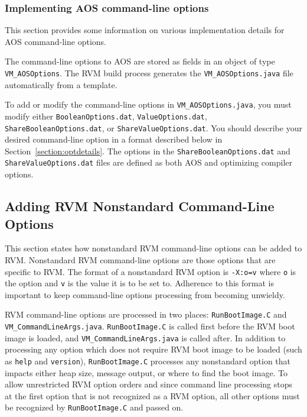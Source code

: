 \subsubsection{Implementing AOS command-line options}

This section provides some information on various
implementation details for AOS command-line options.

The command-line options to AOS are
stored as fields in an object of type {\tt VM\_AOSOptions}.
The RVM build process generates the {\tt VM\_AOSOptions.java} 
file automatically from a template.  

To add or modify the command-line options in {\tt VM\_AOSOptions.java},
you must modify either {\tt BooleanOptions.dat}, {\tt ValueOptions.dat},
{\tt ShareBooleanOptions.dat}, or {\tt ShareValueOptions.dat}.
You should describe your desired command-line option in a format 
described below in Section~\ref{section:optdetails}.
The options in the {\tt ShareBooleanOptions.dat} and {\tt ShareValueOptions.dat}
files are defined as both AOS and optimizing compiler options.

\subsection{Adding RVM Nonstandard Command-Line Options}

This section states how nonstandard RVM command-line options can be added
to RVM.  
Nonstandard RVM command-line options are those options that are specific to RVM.
The format of a nonstandard RVM option is {\tt -X:o=v} where {\tt o} is the 
option and {\tt v} is the value it is to be set to.
Adherence to this format is important to keep command-line options processing
from becoming unwieldy.

RVM command-line options are processed in two places: {\tt RunBootImage.C} and
{\tt VM\_CommandLineArgs.java}.  
{\tt RunBootImage.C} is called first before the RVM boot image is loaded,
and {\tt VM\_CommandLineArgs.java} is called after.
In addition to processing any option which does not require RVM boot image
to be loaded (such as {\tt help} and {\tt version}), 
{\tt RunBootImage.C} processes any nonstandard option that impacts either 
heap size, message output, or where to find the boot image.
To allow unrestricted RVM option orders and 
since command line processing stops at the first option that is not 
recognized as a RVM option, all other options must be recognized by
{\tt RunBootImage.C} and passed on.

